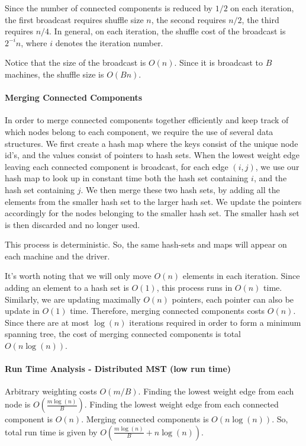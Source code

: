 \documentclass[12pt]{article}
\begin{document}
Since the number of connected components is reduced by $1/2$ on each iteration, the first broadcast requires shuffle size $n$, the second requires $n/2$, the third requires $n/4$. In general, on each iteration, the shuffle cost of the broadcast is $2^{-i}n$, where $i$ denotes the iteration number.

Notice that the size of the broadcast is $O(n)$. Since it is broadcast to $B$ machines, the shuffle size is $O(Bn)$.

\paragraph{Merging Connected Components} 

In order to merge connected components together efficiently and keep track of which nodes belong to each component, we require the use of several data structures. We first create a hash map where the keys consist of the unique node id's, and the values consist of pointers to hash sets. When the lowest weight edge leaving each connected component is broadcast, for each edge $(i,j)$, we use our hash map to look up in constant time both the hash set containing $i$, and the hash set containing $j$. We then merge these two hash sets, by adding all the elements from the smaller hash set to the larger hash set. We update the pointers accordingly for the nodes belonging to the smaller hash set. The smaller hash set is then discarded and no longer used.

This process is deterministic. So, the same hash-sets and maps will appear on each machine and the driver.

It's worth noting that we will only move $O(n)$ elements in each iteration. Since adding an element to a hash set is $O(1)$, this process runs in $O(n)$ time. Similarly, we are updating maximally $O(n)$ pointers, each pointer can also be update in $O(1)$ time. Therefore, merging connected components costs $O(n)$. Since there are at most $\log(n)$ iterations required in order to form a minimum spanning tree, the cost of merging connected components is total $O(n \log(n))$.

\paragraph{Run Time Analysis - Distributed MST (low run time)}

Arbitrary weighting costs $O(m/B)$. Finding the lowest weight edge from each node is $O(\frac{m \log(n)}{B})$. Finding the lowest weight edge from each connected component is $O(n)$. Merging connected components is $O(n \log(n))$. So, total run time is given by $O(\frac{m \log(n)}{B} + n \log(n))$.
\end{document}
